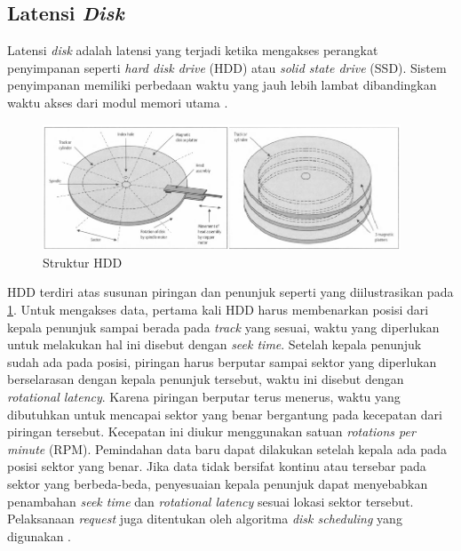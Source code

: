\subsection{Latensi \textit{Disk}}
\label{sec:latensi-disk}

Latensi \textit{disk} adalah latensi yang terjadi ketika mengakses perangkat penyimpanan seperti \textit{hard disk drive} (HDD) atau \textit{solid state drive} (SSD). Sistem penyimpanan memiliki perbedaan waktu yang jauh lebih lambat dibandingkan waktu akses dari modul memori utama \parencite{ng1991improving}.

\begin{figure}[ht]
  \centering
  \includegraphics[width=0.95\textwidth]{resources/chapter-2/disk-structure.png}
  \caption{Struktur HDD \parencite{sammes2000disk}}
  \label{fig:hdd-structure}
\end{figure}


HDD terdiri atas susunan piringan dan penunjuk seperti yang diilustrasikan pada \ref{fig:hdd-structure}. Untuk mengakses data, pertama kali HDD harus membenarkan posisi dari kepala penunjuk sampai berada pada \textit{track} yang sesuai, waktu yang diperlukan untuk melakukan hal ini disebut dengan \textit{seek time}. Setelah kepala penunjuk sudah ada pada posisi, piringan harus berputar sampai sektor yang diperlukan berselarasan dengan kepala penunjuk tersebut, waktu ini disebut dengan \textit{rotational latency}. Karena piringan berputar terus menerus, waktu yang dibutuhkan untuk mencapai sektor yang benar bergantung pada kecepatan dari piringan tersebut. Kecepatan ini diukur menggunakan satuan \textit{rotations per minute} (RPM). Pemindahan data baru dapat dilakukan setelah kepala ada pada posisi sektor yang benar. Jika data tidak bersifat kontinu atau tersebar pada sektor yang berbeda-beda, penyesuaian kepala penunjuk dapat menyebabkan penambahan \textit{seek time} dan \textit{rotational latency} sesuai lokasi sektor tersebut. Pelaksanaan \textit{request} juga ditentukan oleh algoritma \textit{disk scheduling} yang digunakan \parencite{arpaci2018operating}.

